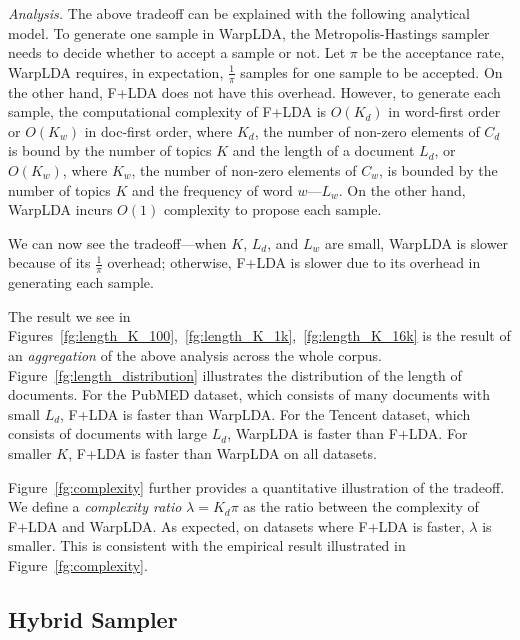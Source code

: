 \documentclass[10pt,journal,cspaper,compsoc]{IEEEtran}
\begin{document}
	\noindent
	{\large \em Analysis.}
	The above tradeoff can be explained with
	the following analytical model.
	To generate one sample in WarpLDA,
	the Metropolis-Hastings sampler
	needs to decide whether to accept a
	sample or not. Let $\pi$
	be the acceptance rate, WarpLDA requires,
	in expectation, $\frac{1}{\pi}$ samples
	for one sample to be accepted. On the other
	hand, F+LDA does not have this overhead.
	However, to generate each sample,
	the computational complexity of F+LDA
	is $O(K_d)$ in word-first order or $O(K_w)$ in doc-first order, where $K_d$,
	the number of non-zero elements of $C_d$
	is bound by the number of topics $K$ and
	the length of a document $L_d$, or $O(K_w)$, where
	$K_w$, the number of non-zero elements of $C_w$,
	is bounded by the number of topics $K$ and the
	frequency of word $w$---$L_w$.
	On the other hand, WarpLDA incurs $O(1)$
	complexity to propose each sample.
	
	We can now see the tradeoff---when
	$K$, $L_d$, and $L_w$ are small, WarpLDA is
	slower because of its $\frac{1}{\pi}$
	overhead; otherwise, F+LDA is slower
	due to its overhead in generating each sample.
	
	The result we see in Figures~\ref{fg:length_K_100},~\ref{fg:length_K_1k},~\ref{fg:length_K_16k}
	is the result of an {\em aggregation}
	of the above analysis across the whole corpus.
	Figure~\ref{fg:length_distribution} illustrates
	the distribution of the length of documents.
	For the PubMED dataset, which consists of many
	documents with small $L_d$, F+LDA is faster
	than WarpLDA. For the Tencent dataset, which
	consists of documents with large $L_d$, WarpLDA
	is faster than F+LDA. For smaller $K$, F+LDA is
	faster than WarpLDA on all datasets.
	
	Figure~\ref{fg:complexity} further provides
	a quantitative illustration of the tradeoff.
	We define a {\em complexity ratio}
	$\lambda = K_d \pi$ as the ratio between
	the complexity of F+LDA and WarpLDA.
	As expected, on datasets
	where F+LDA is faster, $\lambda$ is smaller.
	This is consistent with the empirical
	result illustrated in Figure~\ref{fg:complexity}.
	
	\subsection{Hybrid Sampler}
	\label{sec:hybrid}
	
\end{document}
